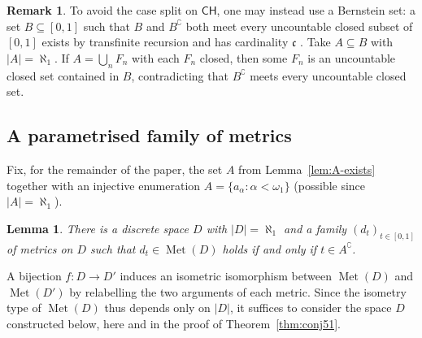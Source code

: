 \documentclass[12pt]{article}
\newtheorem{lemma}[theorem]{Lemma}
\theoremstyle{definition}
\newtheorem{remark}[theorem]{Remark}
\newcommand{\Met}{\operatorname{Met}}
\newcommand{\Cont}{\mathfrak{c}}
\begin{document}
\begin{remark}
  To avoid the case split on $\mathsf{CH}$, one may instead use a
  Bernstein set: a set $B \subseteq [0,1]$ such that $B$ and
  $B^\complement$ both meet every uncountable closed subset of $[0,1]$
  exists by transfinite recursion and has cardinality $\Cont$
  \cite[p.~24]{Oxtoby1980}. Take $A \subseteq B$ with $\lvert A\rvert =
  \aleph_1$. If $A = \bigcup_n F_n$ with each $F_n$ closed, then some
  $F_n$ is an uncountable closed set contained in $B$, contradicting
  that $B^\complement$ meets every uncountable closed set.
\end{remark}

\subsection{A parametrised family of metrics}
\label{subsec:star}

Fix, for the remainder of the paper, the set $A$ from
Lemma~\ref{lem:A-exists} together with an injective enumeration $A =
\{a_\alpha : \alpha < \omega_1\}$ (possible since $\lvert A\rvert =
\aleph_1$).

\begin{lemma}
  \label{lem:star-metric}
  There is a discrete space $D$ with $\lvert D\rvert = \aleph_1$ and a
  family $(d_t)_{t \in [0,1]}$ of metrics on $D$ such that $d_t \in
  \Met(D)$ holds if and only if $t \in A^\complement$.
\end{lemma}

A bijection $f \colon D\to D'$ induces an isometric isomorphism between
$\Met(D)$ and $\Met(D')$ by relabelling the two arguments of each metric.
Since the isometry type of $\Met(D)$ thus depends only on $|D|$, it
suffices to consider the space $D$ constructed below, here and in the
proof of Theorem~\ref{thm:conj51}.
\end{document}
